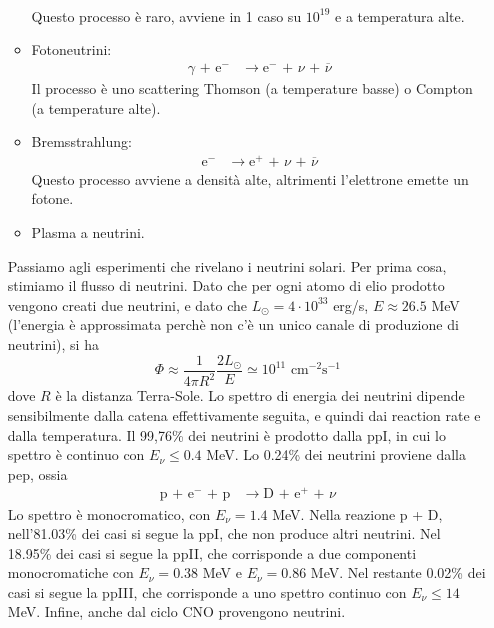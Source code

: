 \documentclass[a4paper,11pt]{article}
\newcommand{\s}{_\odot}
\theoremstyle{theorem}
\theoremstyle{definition}
\begin{document}
\begin{itemize}
\begin{itemize}
\begin{align*}
			\end{align*}
			Questo processo è raro, avviene in 1 caso su $10^{19}$ e a temperatura alte.
			\item Fotoneutrini:
			\begin{align*}
			\gamma\textrm{ + e$^-$}&\rightarrow\textrm{e$^-$ + }\nu\textrm{ + }\overline{\nu}
			\end{align*}
			Il processo è uno scattering Thomson (a temperature basse) o Compton (a temperature alte).
			\item Bremsstrahlung:
			\begin{align*}
				\textrm{e$^-$}&\rightarrow\textrm{e}^+\textrm{ + }\nu\textrm{ + }\overline\nu
			\end{align*}
			Questo processo avviene a densità alte, altrimenti l'elettrone emette un fotone.
			\item Plasma a neutrini.
		\end{itemize}
		Passiamo agli esperimenti che rivelano i neutrini solari. Per prima cosa, stimiamo il flusso di neutrini. Dato che per ogni atomo di elio prodotto vengono creati due neutrini, e dato che $L\s=4\cdot10^{33}$ erg/s, $E\approx26.5$ MeV (l'energia è approssimata perchè non c'è un unico canale di produzione di neutrini), si ha
		\[\Phi\approx\frac{1}{4\pi R^2}\frac{2L\s}{E}\simeq 10^{11}\textrm{ cm}^{-2}\textrm{s}^{-1}\]
		dove $R$ è la distanza Terra-Sole. Lo spettro di energia dei neutrini dipende sensibilmente dalla catena effettivamente seguita, e quindi dai reaction rate e dalla temperatura. Il 99,76\% dei neutrini è prodotto dalla ppI, in cui lo spettro è continuo con $E_\nu\leq0.4$ MeV. Lo 0.24\% dei neutrini proviene dalla pep, ossia
		\begin{align*}
			\textrm{p + e$^-$ + p}&\rightarrow\textrm{D + e$^+$ + }\nu
		\end{align*}
		Lo spettro è monocromatico, con $E_\nu=1.4$ MeV. Nella reazione p + D, nell'81.03\% dei casi si segue la ppI, che non produce altri neutrini. Nel 18.95\% dei casi si segue la ppII, che corrisponde a due componenti monocromatiche con $E_\nu=0.38$ MeV e $E_\nu=0.86$ MeV. Nel restante 0.02\% dei casi si segue la ppIII, che corrisponde a uno spettro continuo con $E_\nu\leq 14$ MeV. Infine, anche dal ciclo CNO provengono neutrini.
		

\end{itemize}
\end{document}
